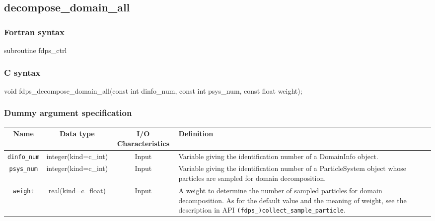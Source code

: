 \subsection{decompose\_domain\_all}
\subsubsection*{Fortran syntax}
\begin{screen}
\begin{spverbatim}
subroutine fdps_ctrl%
\end{spverbatim}
\end{screen}

\subsubsection*{C syntax}
\begin{screen}
\begin{spverbatim}
void fdps_decompose_domain_all(const int dinfo_num, 
                               const int psys_num,  
                               const float weight); 
\end{spverbatim}
\end{screen}


\subsubsection*{Dummy argument specification}
\begin{table}[h]
\begin{tabularx}{\linewidth}{cccX}
\toprule
\rowcolor{Snow2}
Name & Data type & I/O Characteristics & Definition \\
\midrule
\texttt{dinfo\_num} & integer(kind=c\_int) & Input & Variable giving the identification number of a DomainInfo object.\\
\texttt{psys\_num} & integer(kind=c\_int) & Input & Variable giving the identification number of a ParticleSystem object whose particles are sampled for domain decomposition. \\
\texttt{weight} & real(kind=c\_float) & Input & A weight to determine the number of sampled particles for domain decomposition. As for the default value and the meaning of weight, see the description in API \texttt{(fdps\_)collect\_sample\_particle}. \\
\bottomrule
\end{tabularx}
\end{table}

